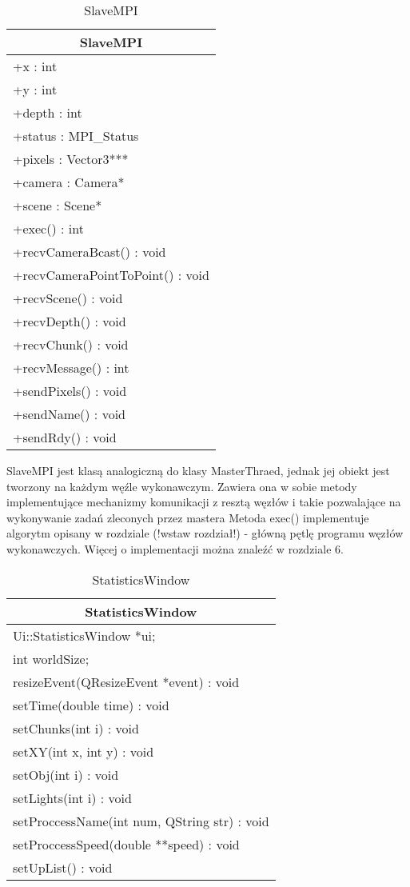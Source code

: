 \begin{longtable}{|p{16cm}|}
    \caption{SlaveMPI} \label{tab:SlaveMPI} \\ \hline
    \multicolumn{1}{|c|}{SlaveMPI} \\ \hline
    +x : int \\ 
	+y : int \\
	+depth : int \\
	+status : MPI\_Status \\
	+pixels : Vector3*** \\
	+camera : Camera* \\
	+scene : Scene* \\ \hline
	+exec() : int \\
	+recvCameraBcast() : void \\
	+recvCameraPointToPoint() : void \\
	+recvScene() : void \\
	+recvDepth() : void \\
	+recvChunk() : void \\
	+recvMessage() : int \\
	+sendPixels() : void \\
	+sendName() : void \\
	+sendRdy() : void \\
	\hline
\end{longtable}

SlaveMPI jest klasą analogiczną do klasy MasterThraed, jednak jej obiekt jest tworzony na każdym węźle wykonawczym. Zawiera ona w sobie metody implementujące mechanizmy komunikacji z resztą węzłów i takie pozwalające na wykonywanie zadań zleconych przez mastera  Metoda exec() implementuje algorytm opisany w rozdziale (!wstaw rozdział!) - główną pętlę programu węzłów wykonawczych. Więcej o implementacji można znaleźć w rozdziale 6.

\begin{longtable}{|p{16cm}|}
    \caption{StatisticsWindow} \label{tab:StatisticsWindow} \\ \hline
    \multicolumn{1}{|c|}{StatisticsWindow} \\ \hline
    Ui::StatisticsWindow *ui; \\
    int worldSize; \\
    \hline
	resizeEvent(QResizeEvent *event) : void \\
    setTime(double time) : void  \\
    setChunks(int i) : void \\
    setXY(int x, int y) : void \\
    setObj(int i) : void \\
    setLights(int i) : void  \\
    setProccessName(int num, QString str) : void \\
    setProccessSpeed(double **speed) : void \\
    setUpList() : void \\
    \hline
\end{longtable}

